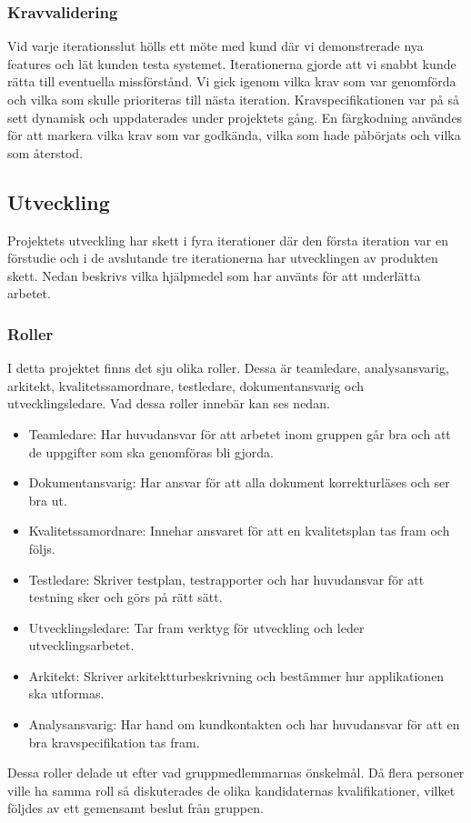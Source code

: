 \documentclass{article}
\begin{document}
\subsubsection{Kravvalidering}
Vid varje iterationsslut hölls ett möte med kund där vi demonstrerade nya features och lät kunden testa systemet. Iterationerna gjorde att vi snabbt kunde rätta till eventuella missförstånd. Vi gick igenom vilka krav som var genomförda och vilka som skulle prioriteras till nästa iteration. Kravspecifikationen var på så sett dynamisk och uppdaterades under projektets gång. En färgkodning användes för att markera vilka krav som var godkända, vilka som hade påbörjats och vilka som återstod.

\subsection{Utveckling}
Projektets utveckling har skett i fyra iterationer där den första iteration var en förstudie och i de avslutande tre iterationerna har utvecklingen av produkten skett. Nedan beskrivs vilka hjälpmedel som har använts för att underlätta arbetet.

\subsubsection{Roller}
I detta projektet finns det sju olika roller. Dessa är teamledare, analysansvarig, arkitekt, kvalitetssamordnare, testledare, dokumentansvarig och utvecklingsledare. Vad dessa roller innebär kan ses nedan. 
\begin{itemize}
\item Teamledare: Har huvudansvar för att arbetet inom gruppen går bra och att de uppgifter som ska genomföras bli gjorda. 
\item Dokumentansvarig: Har ansvar för att alla dokument korrekturläses och ser bra ut. 
\item Kvalitetssamordnare: Innehar ansvaret för att en kvalitetsplan tas fram och följs. 
\item Testledare: Skriver testplan, testrapporter och har huvudansvar för att testning sker och görs på rätt sätt.
\item Utvecklingsledare: Tar fram verktyg för utveckling och leder utvecklingsarbetet.
\item Arkitekt: Skriver arkitektturbeskrivning och bestämmer hur applikationen ska utformas.
\item Analysansvarig: Har hand om kundkontakten och har huvudansvar för att en bra kravspecifikation tas fram.
\end{itemize}
Dessa roller delade ut efter vad gruppmedlemmarnas önskelmål. Då flera personer ville ha samma roll så diskuterades de olika kandidaternas kvalifikationer, vilket följdes av ett gemensamt beslut från gruppen.
\end{document}
